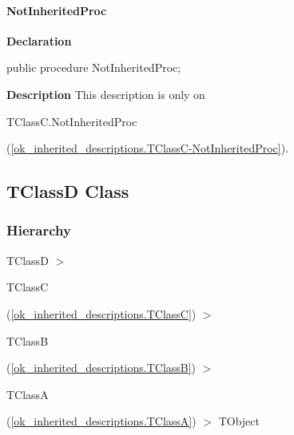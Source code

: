 \documentclass{report}
\newif\ifpdf
\begin{document}
\paragraph*{NotInheritedProc}\hspace*{\fill}

\label{ok_inherited_descriptions.TClassC-NotInheritedProc}
\begin{list}{}{
\setlength{\itemindent}{0cm}
\setlength{\listparindent}{0cm}
\setlength{\leftmargin}{\evensidemargin}
\addtolength{\leftmargin}{\tmplength}
\settowidth{\labelsep}{X}
\addtolength{\leftmargin}{\labelsep}
\setlength{\labelwidth}{\tmplength}
}
\item[\textbf{Declaration}\hfill]
\ifpdf
\begin{flushleft}
\fi
\begin{ttfamily}
public procedure NotInheritedProc;\end{ttfamily}

\ifpdf
\end{flushleft}
\fi

\par
\item[\textbf{Description}]
This description is only on \begin{ttfamily}TClassC.NotInheritedProc\end{ttfamily}(\ref{ok_inherited_descriptions.TClassC-NotInheritedProc}).

\end{list}
\ifpdf
\subsection*{\large{\textbf{TClassD Class}}\normalsize\hspace{1ex}\hrulefill}
\else
\subsection*{TClassD Class}
\fi
\label{ok_inherited_descriptions.TClassD}
\subsubsection*{\large{\textbf{Hierarchy}}\normalsize\hspace{1ex}\hfill}
TClassD {$>$} \begin{ttfamily}TClassC\end{ttfamily}(\ref{ok_inherited_descriptions.TClassC}) {$>$} \begin{ttfamily}TClassB\end{ttfamily}(\ref{ok_inherited_descriptions.TClassB}) {$>$} \begin{ttfamily}TClassA\end{ttfamily}(\ref{ok_inherited_descriptions.TClassA}) {$>$} 
TObject
\end{document}
